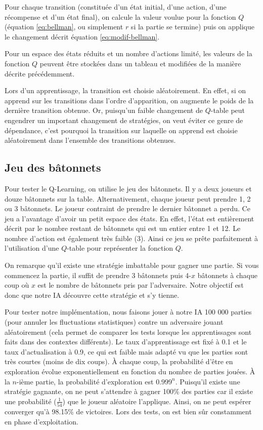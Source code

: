 Pour chaque transition (constituée d'un état initial, d'une action, d'une récompense et d'un état final), on calcule la valeur voulue pour la fonction $Q$ 
(équation \ref{eq:bellman}, ou simplement $r$ si la partie se termine) puis on applique le changement décrit équation \ref{eq:modif-bellman}.

Pour un espace des états réduits et un nombre d'actions limité, les valeurs de la fonction $Q$ peuvent être stockées dans un tableau et modifiées de la manière
décrite précédemment.

Lors d'un apprentissage, la transition est choisie aléatoirement. En effet, si on apprend sur les transitions dans l'ordre d'apparition, on augmente le poids de la
dernière transition obtenue. Or, puisqu'un faible changement de $Q$-table peut engendrer un important changement de stratégies, on veut éviter ce genre de dépendance,
c'est pourquoi la transition sur laquelle on apprend est choisie aléatoirement dans l'ensemble des transitions obtenues.


\subsection{Jeu des bâtonnets}

Pour tester le Q-Learning, on utilise le jeu des bâtonnets. Il y a deux joueurs et douze bâtonnets sur la table. Alternativement, chaque joueur peut prendre
1, 2 ou 3 bâtonnets. Le joueur contraint de prendre le dernier bâtonnet a perdu. Ce jeu a l'avantage d'avoir un petit espace des états. En effet, l'état est entièrement
décrit par le nombre restant de bâtonnets qui est un entier entre 1 et 12. Le nombre d'action est également très faible (3). Ainsi ce jeu se prête parfaitement à
l'utilisation d'une $Q$-table pour représenter la fonction $Q$.

On remarque qu'il existe une stratégie imbattable pour gagner une partie. Si vous commencez la partie, il suffit de prendre 3 bâtonnets puis 4-$x$ bâtonnets à chaque coup
où $x$ est le nombre de bâtonnets pris par l'adversaire. Notre objectif est donc que notre IA découvre cette stratégie et s'y tienne. 

Pour tester notre implémentation, nous faisons jouer à notre IA 100 000 parties (pour annuler les fluctuations statistiques) contre un adversaire jouant aléatoirement
(cela permet de comparer les tests lorsque les apprentissages sont faits dans des contextes différents). Le taux d'apprentissage est fixé à 0.1 et le taux d'actualisation
à 0.9, ce qui est faible mais adapté vu que les parties sont très courtes (moins de dix coups). À chaque coup, la probabilité d'être en exploration évolue 
exponentiellement en fonction du nombre de parties jouées. À la $n$-ième partie, la probabilité d'exploration est $0.999^n$. Puisqu'il existe une stratégie gagnante,
on ne peut s'attendre à gagner 100\% des parties car il existe une probabilité ($\frac{1}{54}$) que le joueur aléatoire l'applique. Ainsi, on ne peut espérer 
converger qu'à 98.15\% de victoires. Lors des tests, on est bien sûr constamment en phase d'exploitation.

